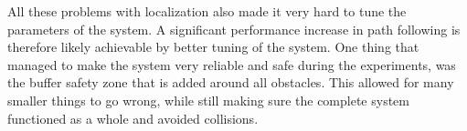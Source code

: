 All these problems with localization also made it very hard to tune the parameters of the system. A significant performance increase in path following is therefore likely achievable by better tuning of the system. One thing that managed to make the system very reliable and safe during the experiments, was the buffer safety zone that is added around all obstacles. This allowed for many smaller things to go wrong, while still making sure the complete system functioned as a whole and avoided collisions.

